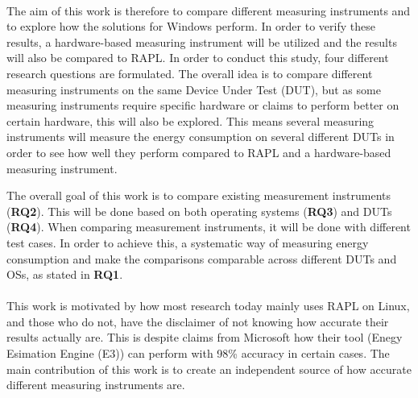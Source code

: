 \paragraph*{}
The aim of this work is therefore to compare different measuring instruments and to explore how the solutions for Windows perform. In order to verify these results, a hardware-based measuring instrument will be utilized and the results will also be compared to RAPL. In order to conduct this study, four different research questions are formulated. The overall idea is to compare different measuring instruments on the same Device Under Test (DUT), but as some measuring instruments require specific hardware or claims to perform better on certain hardware, this will also be explored. This means several measuring instruments will measure the energy consumption on several different DUTs in order to see how well they perform compared to RAPL and a hardware-based measuring instrument.



The overall goal of this work is to compare existing measurement instruments (\textbf{RQ2}). This will be done based on both operating systems (\textbf{RQ3}) and DUTs (\textbf{RQ4}). When comparing measurement instruments, it will be done with different test cases. In order to achieve this, a systematic way of measuring energy consumption and make the comparisons comparable across different DUTs and OSs, as stated in \textbf{RQ1}.

\paragraph*{}
This work is motivated by how most research today mainly uses RAPL on Linux\cite[]{Rasmussen2021,Pereira2017,Theilmann2022,Lindholt2022}, and those who do not, have the disclaimer of not knowing how accurate their results actually are\cite[]{Bruce2015ReducingEC, Ozturk2019, Unlu2021}. This is despite claims from Microsoft how their tool (Enegy Esimation Engine (E3)) can perform with 98\% accuracy in certain cases\cite[]{E3WinHec}. The main contribution of this work is to create an independent source of how accurate different measuring instruments are.


